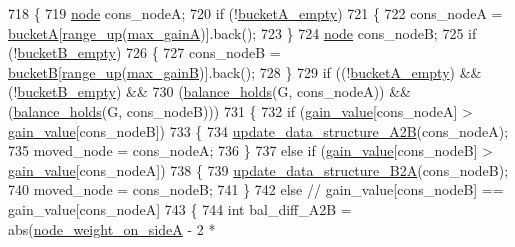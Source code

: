 \begin{DoxyCode}
718 \{
719     \mbox{\hyperlink{classnode}{node}} cons\_nodeA;
720     \textcolor{keywordflow}{if} (!\mbox{\hyperlink{classfm__partition_a4df2f0f6f4686ba187c2be39ce3b29cc}{bucketA\_empty}})
721     \{
722     cons\_nodeA = \mbox{\hyperlink{classfm__partition_a399955e0c84bad93cb82b5ffe8cf4a04}{bucketA}}[\mbox{\hyperlink{classfm__partition_ac49d477ecbf512fa375b76a472ec54f8}{range\_up}}(\mbox{\hyperlink{classfm__partition_a6c6a7a05bebe943e681329d30bb13339}{max\_gainA}})].back();
723     \}
724     \mbox{\hyperlink{classnode}{node}} cons\_nodeB;
725     \textcolor{keywordflow}{if} (!\mbox{\hyperlink{classfm__partition_aef7d0f91cb7c04b4f5b1b14cc9884c37}{bucketB\_empty}})
726     \{
727     cons\_nodeB = \mbox{\hyperlink{classfm__partition_ae6a5b5f3f2d95ea229882e861ccfc9e4}{bucketB}}[\mbox{\hyperlink{classfm__partition_ac49d477ecbf512fa375b76a472ec54f8}{range\_up}}(\mbox{\hyperlink{classfm__partition_ac230f89828768eaf51374c0bc3b37558}{max\_gainB}})].back();
728     \}
729     \textcolor{keywordflow}{if} ((!\mbox{\hyperlink{classfm__partition_a4df2f0f6f4686ba187c2be39ce3b29cc}{bucketA\_empty}}) && (!\mbox{\hyperlink{classfm__partition_aef7d0f91cb7c04b4f5b1b14cc9884c37}{bucketB\_empty}}) &&
730     (\mbox{\hyperlink{classfm__partition_a6dc702df474c4ce60e80b3e5a93b7f4d}{balance\_holds}}(G, cons\_nodeA)) && (\mbox{\hyperlink{classfm__partition_a6dc702df474c4ce60e80b3e5a93b7f4d}{balance\_holds}}(G, cons\_nodeB)))
731     \{
732     \textcolor{keywordflow}{if} (\mbox{\hyperlink{classfm__partition_ae8176f4ce82305abfd58e519d2cdd91d}{gain\_value}}[cons\_nodeA] > \mbox{\hyperlink{classfm__partition_ae8176f4ce82305abfd58e519d2cdd91d}{gain\_value}}[cons\_nodeB])
733     \{
734         \mbox{\hyperlink{classfm__partition_a8bd7f2715334e9ec95da8001117fdde5}{update\_data\_structure\_A2B}}(cons\_nodeA);
735         moved\_node = cons\_nodeA;
736     \}
737     \textcolor{keywordflow}{else} \textcolor{keywordflow}{if} (\mbox{\hyperlink{classfm__partition_ae8176f4ce82305abfd58e519d2cdd91d}{gain\_value}}[cons\_nodeB] > \mbox{\hyperlink{classfm__partition_ae8176f4ce82305abfd58e519d2cdd91d}{gain\_value}}[cons\_nodeA])
738     \{
739         \mbox{\hyperlink{classfm__partition_a783174f29d49e7e1ae7f6cf71faa82fb}{update\_data\_structure\_B2A}}(cons\_nodeB);
740         moved\_node = cons\_nodeB;
741     \}
742     \textcolor{keywordflow}{else}    \textcolor{comment}{// gain\_value[cons\_nodeB] == gain\_value[cons\_nodeA]}
743     \{
744         \textcolor{keywordtype}{int} bal\_diff\_A2B = abs(\mbox{\hyperlink{classfm__partition_a8a50d15b399c9ed35d6987c8fb68aa2b}{node\_weight\_on\_sideA}} - 2 *

\end{DoxyCode}
